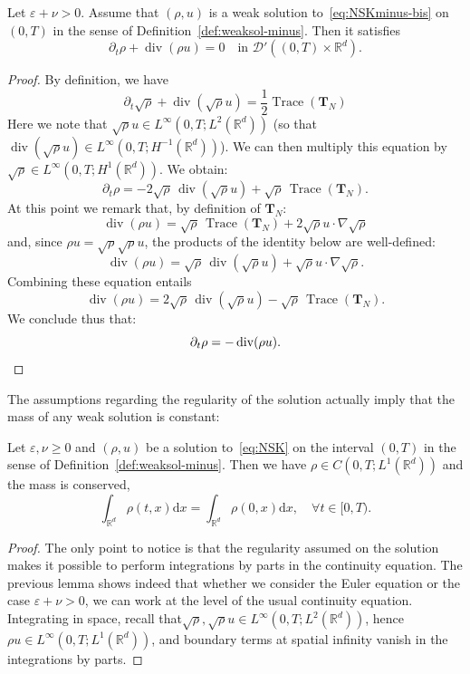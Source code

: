 \documentclass[AHL,Unicode,longabstracts]{cedram}
\DeclareMathOperator{\DIV}{div}
\DeclareMathOperator{\Trace}{Trace}
\newcommand*\R{\mathbb{R}}
\newcommand*\dd {\mathrm{d}}
\newcommand*\<{\left\langle}
\renewcommand*\>{\right\rangle}
\renewcommand*\ge{\geqslant}
\newcommand*\eps{\varepsilon}
\let\oldforall\forall
\renewcommand*{\forall}{\mathrel{\oldforall}}
\begin{document}
\begin{lemm}\label{lem:continuite}
Let $\eps + \nu >0$. Assume that $(\rho,u)$ is a weak solution to~\eqref{eq:NSKminus-bis} on $(0,T)$ in the sense of Definition~\ref{def:weaksol-minus}. Then it satisfies
\[
\partial_t \rho + \DIV(\rho u) = 0 \quad \text{in \ $\mathcal D'((0,T) \times \mathbb R^d).$}
\]
\end{lemm}

\begin{proof}
By definition, we have
\[
\partial_t\sqrt{\rho}+\DIV\left(\sqrt{\rho} u\right)= \frac{1}{2}\Trace(\mathbf T_N)
\]
Here we note that $\sqrt{\rho}u \in L^{\infty}(0,T;L^{2}(\mathbb R^d))$ (so that $\DIV(\sqrt{\rho}u) \in L^{\infty}(0,T;H^{-1}(\mathbb R^d))$). We can then multiply this equation by $\sqrt{\rho} \in L^{\infty}(0,T;H^1(\mathbb R^d)).$ We obtain:
\[
\partial_t {\rho} = - 2\sqrt{\rho}\, \DIV(\sqrt{\rho}u) + \sqrt{\rho}\, \Trace(\mathbf T_N).
\]
At this point we remark that, by definition of $\mathbf T_N:$
\[
\DIV(\rho u) = \sqrt{\rho}\, \Trace(\mathbf T_N) + 2 \sqrt{\rho} u
\cdot \nabla \sqrt{\rho}
\]
and, since $\rho u = \sqrt{\rho} \sqrt{\rho} u$, the products of the identity below are well-defined:
\[
\DIV(\rho u) = \sqrt{\rho}\, \DIV(\sqrt{\rho}u) +
\sqrt{\rho} u \cdot \nabla \sqrt{\rho}.
\]
Combining these equation entails
\[
\DIV(\rho u) = 2\sqrt{\rho}\, \DIV(\sqrt{\rho} u) -
\sqrt{\rho}\, \Trace({\mathbf T}_N).
\]
We conclude thus that:
\[
\partial_t {\rho} = -\DIV(\rho u).\qedhere
\]
\end{proof}

The assumptions regarding the regularity of the solution actually imply that the mass of any weak solution is constant:

\begin{lemm}\label{lem:masse-conservee}
Let $\eps,\nu\ge 0$ and $(\rho,u)$ be a solution to~\eqref{eq:NSK} on the interval $(0,T)$ in the sense of Definition~\ref{def:weaksol-minus}. Then we have $\rho \in C(0,T;L^1(\R^d))$ and the mass is conserved,
\[
\int_{\R^d}\rho(t,x) \dd x=\int_{\R^d}\rho(0,x) \dd x,\quad \forall t\in [0,T).
\]
\end{lemm}

\begin{proof}
The only point to notice is that the regularity assumed on the solution makes it possible to perform integrations by parts in the continuity equation. The previous lemma shows indeed that whether we consider the Euler equation or the case $\eps+\nu>0$, we can work at the level of the usual continuity equation. Integrating in space, recall that$\sqrt\rho,\sqrt \rho u\in L^\infty(0,T;L^2(\R^d))$, hence $\rho u\in L^\infty(0,T;L^1(\R^d))$, and boundary terms at spatial infinity vanish in the integrations by parts.
\end{proof}
\end{document}
